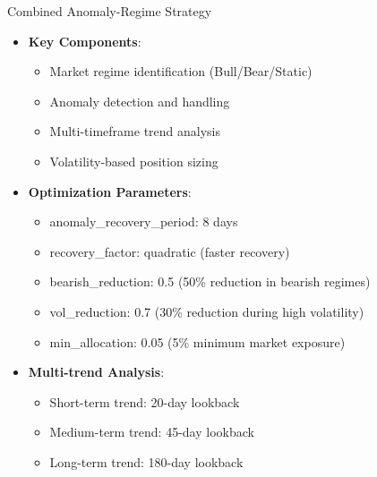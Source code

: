 \documentclass[aspectratio=169,xcolor=dvipsnames]{beamer}
\begin{document}
\begin{frame}{Combined Anomaly-Regime Strategy}
    \begin{itemize}
        \item \textbf{Key Components}:
              \begin{itemize}
                  \item Market regime identification (Bull/Bear/Static)
                  \item Anomaly detection and handling
                  \item Multi-timeframe trend analysis
                  \item Volatility-based position sizing
              \end{itemize}
        \item \textbf{Optimization Parameters}:
              \begin{itemize}
                  \item anomaly\_recovery\_period: 8 days
                  \item recovery\_factor: quadratic (faster recovery)
                  \item bearish\_reduction: 0.5 (50\% reduction in bearish regimes)
                  \item vol\_reduction: 0.7 (30\% reduction during high volatility)
                  \item min\_allocation: 0.05 (5\% minimum market exposure)
              \end{itemize}
        \item \textbf{Multi-trend Analysis}:
              \begin{itemize}
                  \item Short-term trend: 20-day lookback
                  \item Medium-term trend: 45-day lookback
                  \item Long-term trend: 180-day lookback
              \end{itemize}
    \end{itemize}
\end{frame}
\end{document}
